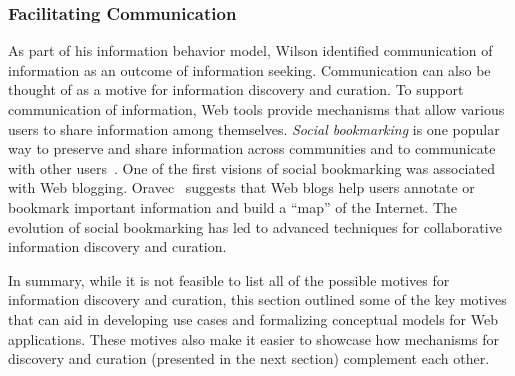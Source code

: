 \documentclass{sigchi}
\begin{document}
{{{}

{\subsubsection{Facilitating Communication}
As part of his information behavior model, Wilson identified communication of information as an outcome of information seeking. Communication can also be thought of as a motive for information discovery and curation. To support communication of information, Web tools provide mechanisms that allow various users to share information among themselves. 
%
\textit{Social bookmarking} is one popular way to preserve and share information across communities and to communicate with other users~\cite{estelles2010social}. One of the first visions of social bookmarking was associated with Web blogging. Oravec~\cite{oravec2002bookmarking} suggests that Web blogs help users annotate or bookmark important information and build a ``map'' of the Internet. The evolution of social bookmarking has led to advanced techniques for collaborative information discovery and curation. 
}

In summary, while it is not feasible to list all of the possible motives for information discovery and curation, this section outlined some of the key motives that can aid in developing use cases and formalizing conceptual models for Web applications. These motives also make it easier to showcase how mechanisms for discovery and curation (presented in the next section) complement each other.
} 
}
\end{document}
